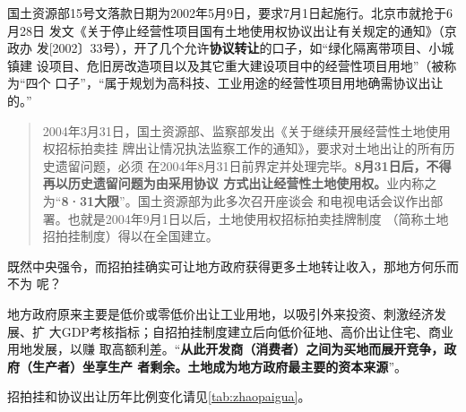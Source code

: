 国土资源部15号文落款日期为2002年5月9日，要求7月1日起施行。北京市就抢于6月28日
发文《关于停止经营性项目国有土地使用权协议出让有关规定的通知》（京政办
发[2002〕33号），开了几个允许\textbf{协议转让}的口子，如“绿化隔离带项目、小城镇建
设项目、危旧房改造项目以及其它重大建设项目中的经营性项目用地”（被称为“四个
口子”，“属于规划为高科技、工业用途的经营性项目用地确需协议出让的。”

\begin{quotation}
2004年3月31日，国土资源部、监察部发出《关于继续开展经营性土地使用权招标拍卖挂
牌出让情况执法监察工作的通知》，要求对土地出让的所有历史遗留问题，必须
在2004年8月31日前界定并处理完毕。\textbf{8月31日后，不得再以历史遗留问题为由采用协议
方式出让经营性土地使用权。}业内称之为“\textbf{8·31大限}”。国土资源部为此多次召开座谈会
和电视电话会议作出部署。也就是2004年9月1日以后，土地使用权招标拍卖挂牌制度
（简称土地招拍挂制度）得以在全国建立。
\end{quotation}

既然中央强令，而招拍挂确实可让地方政府获得更多土地转让收入，那地方何乐而不为
呢？

地方政府原来主要是低价或零低价出让工业用地，以吸引外来投资、刺激经济发展、扩
大GDP考核指标；自招拍挂制度建立后向低价征地、高价出让住宅、商业用地发展，以赚
取高额利差。“\textbf{从此开发商（消费者）之间为买地而展开竞争，政府（生产者）坐享生产
者剩余。土地成为地方政府最主要的资本来源}”\cite{dajueqi}。

招拍挂和协议出让历年比例变化请见\cref{tab:zhaopaigua}。
\begin{table}[]
\centering
{}
\caption{不同土地出让方式出让土地面积、收入的构成}
\label{tab:zhaopaigua}
\end{table}


